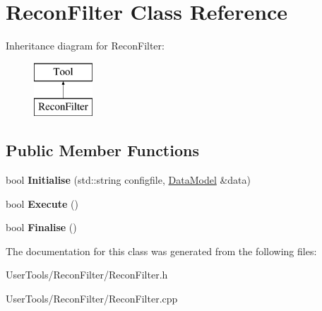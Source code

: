 \hypertarget{classReconFilter}{\section{Recon\-Filter Class Reference}
\label{classReconFilter}
}
Inheritance diagram for Recon\-Filter\-:\begin{figure}[H]
\begin{center}
\leavevmode
\includegraphics[height=2.000000cm]{classReconFilter}
\end{center}
\end{figure}
\subsection*{Public Member Functions}
\begin{DoxyCompactItemize}
\item 
\hypertarget{classReconFilter_acdcfc0da11326a8eef6abdbabe875370}{bool {\bfseries Initialise} (std\-::string configfile, \hyperlink{classDataModel}{Data\-Model} \&data)}\label{classReconFilter_acdcfc0da11326a8eef6abdbabe875370}

\item 
\hypertarget{classReconFilter_aab5a05ec6308957aa6197ea698589b5e}{bool {\bfseries Execute} ()}\label{classReconFilter_aab5a05ec6308957aa6197ea698589b5e}

\item 
\hypertarget{classReconFilter_af167ee66ac9dbb412bf0954be8046ef4}{bool {\bfseries Finalise} ()}\label{classReconFilter_af167ee66ac9dbb412bf0954be8046ef4}

\end{DoxyCompactItemize}


The documentation for this class was generated from the following files\-:\begin{DoxyCompactItemize}
\item 
User\-Tools/\-Recon\-Filter/Recon\-Filter.\-h\item 
User\-Tools/\-Recon\-Filter/Recon\-Filter.\-cpp\end{DoxyCompactItemize}
